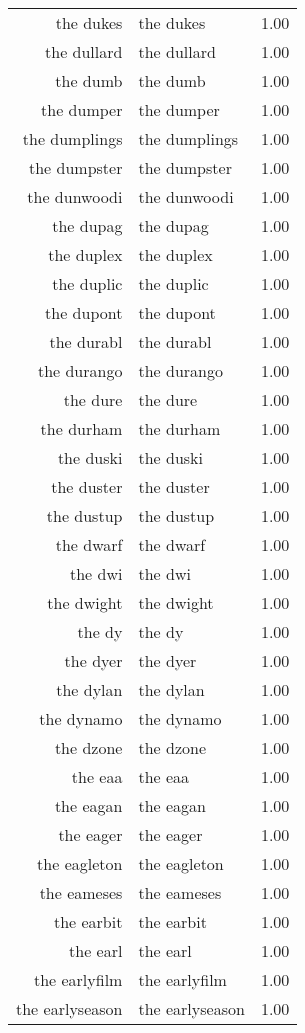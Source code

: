 \begin{table}[ht]
\begin{tabular}{rlr}
  the dukes & the dukes & 1.00 \\ 
  the dullard & the dullard & 1.00 \\ 
  the dumb & the dumb & 1.00 \\ 
  the dumper & the dumper & 1.00 \\ 
  the dumplings & the dumplings & 1.00 \\ 
  the dumpster & the dumpster & 1.00 \\ 
  the dunwoodi & the dunwoodi & 1.00 \\ 
  the dupag & the dupag & 1.00 \\ 
  the duplex & the duplex & 1.00 \\ 
  the duplic & the duplic & 1.00 \\ 
  the dupont & the dupont & 1.00 \\ 
  the durabl & the durabl & 1.00 \\ 
  the durango & the durango & 1.00 \\ 
  the dure & the dure & 1.00 \\ 
  the durham & the durham & 1.00 \\ 
  the duski & the duski & 1.00 \\ 
  the duster & the duster & 1.00 \\ 
  the dustup & the dustup & 1.00 \\ 
  the dwarf & the dwarf & 1.00 \\ 
  the dwi & the dwi & 1.00 \\ 
  the dwight & the dwight & 1.00 \\ 
  the dy & the dy & 1.00 \\ 
  the dyer & the dyer & 1.00 \\ 
  the dylan & the dylan & 1.00 \\ 
  the dynamo & the dynamo & 1.00 \\ 
  the dzone & the dzone & 1.00 \\ 
  the eaa & the eaa & 1.00 \\ 
  the eagan & the eagan & 1.00 \\ 
  the eager & the eager & 1.00 \\ 
  the eagleton & the eagleton & 1.00 \\ 
  the eameses & the eameses & 1.00 \\ 
  the earbit & the earbit & 1.00 \\ 
  the earl & the earl & 1.00 \\ 
  the earlyfilm & the earlyfilm & 1.00 \\ 
  the earlyseason & the earlyseason & 1.00 \\ 

\end{tabular}
\end{table}
